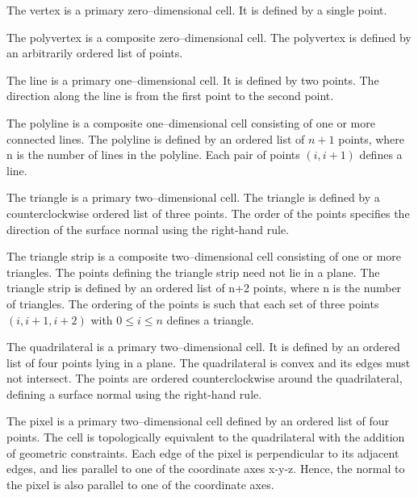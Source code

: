 \begin{description}[leftmargin=0cm,labelindent=0cm]

\item[Vertex.\index{cell!vertex}] The vertex is a primary zero--dimensional cell. It is defined by a single point.

\item[Polyvertex.\index{cell!polyvertex}] The polyvertex is a composite zero--dimensional cell. The polyvertex is defined by an arbitrarily ordered list of points.

\item[Line.\index{cell!line}\index{line}] The line is a primary one--dimensional cell. It is defined by two points. The direction along the line is from the first point to the second point.

\item[Polyline.\index{cell!polyline}] The polyline is a composite one--dimensional cell consisting of one or more connected lines. The polyline is defined by an ordered list of $n+1$ points, where n is the number of lines in the polyline. Each pair of points $(i, i+1)$ defines a line.

\item[Triangle.\index{cell!triangle}] \label{subsec:linear_cells.triangle_strip} The triangle is a primary two--dimensional cell. The triangle is defined by a counterclockwise ordered list of three points. The order of the points specifies the direction of the surface normal using the right-hand rule.

\item[Triangle Strip.\index{cell!triangle strip}] The triangle strip is a composite two--dimensional cell consisting of one or more triangles. The points defining the triangle strip need not lie in a plane. The triangle strip is defined by an ordered list of n+2 points, where n is the number of triangles. The ordering of the points is such that each set of three points $(i,i+1,i+2)$ with $0 \leq i \leq n$ defines a triangle.

\item[Quadrilateral.\index{cell!quadrilateral}] The quadrilateral is a primary two--dimensional cell. It is defined by an ordered list of four points lying in a plane. The quadrilateral is convex and its edges must not intersect. The points are ordered counterclockwise around the quadrilateral, defining a surface normal using the right-hand rule.

\item[Pixel.\index{cell!pixel}] The pixel is a primary two--dimensional cell defined by an ordered list of four points. The cell is topologically equivalent to the quadrilateral with the addition of geometric constraints. Each edge of the pixel is perpendicular to its adjacent edges, and lies parallel to one of the coordinate axes x-y-z. Hence, the normal to the pixel is also parallel to one of the coordinate axes.


\end{description}
